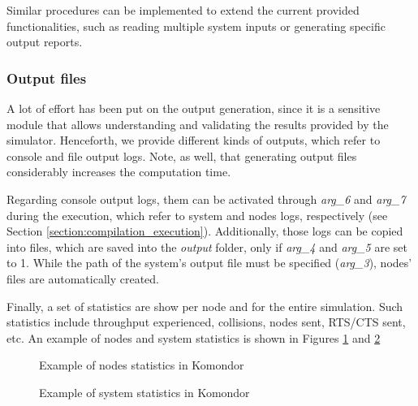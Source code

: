 \documentclass[a4paper]{article}
\begin{document}
		Similar procedures can be implemented to extend the current provided functionalities, such as reading multiple system inputs or generating specific output reports.
		
		\subsubsection{Output files}
		\label{section:output_files}	
		A lot of effort has been put on the output generation, since it is a sensitive module that allows understanding and validating the results provided by the simulator. Henceforth, we provide different kinds of outputs, which refer to console and file output logs. Note, as well, that generating output files considerably increases the computation time. 
		
		Regarding console output logs, them can be activated through \emph{arg\_6} and \emph{arg\_7} during the execution, which refer to system and nodes logs, respectively (see Section \ref{section:compilation_execution}). Additionally, those logs can be copied into files, which are saved into the \emph{output} folder, only if \emph{arg\_4} and \emph{arg\_5} are set to 1. While the path of the system's output file must be specified (\emph{arg\_3}), nodes' files are automatically created. 
		
		Finally, a set of statistics are show per node and for the entire simulation. Such statistics include throughput experienced, collisions, nodes sent, RTS/CTS sent, etc. An example of nodes and system statistics is shown in Figures \ref{fig:nodes_statistics_example} and \ref{fig:general_statistics_example}
		\begin{figure}[h!]
			\centering
			\caption{Example of nodes statistics in Komondor}
			\label{fig:nodes_statistics_example}
		\end{figure}
		
		\begin{figure}[h!]
			\centering
			\caption{Example of system statistics in Komondor}
			\label{fig:general_statistics_example}
		\end{figure}
	
\end{document}
